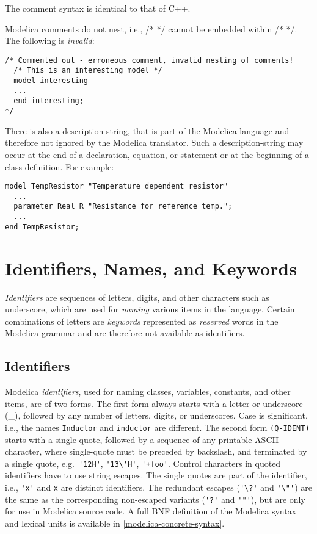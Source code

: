 \begin{nonnormative}
The comment syntax is identical to that of C++.
\end{nonnormative}

Modelica comments do not nest, i.e., /* */ cannot be embedded within /*
*/. The following is \emph{invalid}:
\begin{lstlisting}[language=modelica]
/* Commented out - erroneous comment, invalid nesting of comments!
  /* This is an interesting model */
  model interesting
  ...
  end interesting;
*/
\end{lstlisting}

There is also a description-string, that is part of the Modelica language and
therefore not ignored by the Modelica translator. Such a description-string may
occur at the end of a declaration, equation, or statement or at the
beginning of a class definition. For example:
\begin{lstlisting}[language=modelica]
model TempResistor "Temperature dependent resistor"
  ...
  parameter Real R "Resistance for reference temp.";
  ...
end TempResistor;
\end{lstlisting}

\section{Identifiers, Names, and Keywords}\label{identifiers-names-and-keywords}

\emph{Identifiers} are sequences of letters, digits, and other
characters such as underscore, which are used for \emph{naming} various
items in the language. Certain combinations of letters are
\emph{keywords} represented as \emph{reserved} words in the Modelica
grammar and are therefore not available as identifiers.

\subsection{Identifiers}\label{identifiers}

Modelica \emph{identifiers}, used for naming classes, variables,
constants, and other items, are of two forms. The first form always
starts with a letter or underscore (\_), followed by any number of
letters, digits, or underscores. Case is significant, i.e., the names
\lstinline!Inductor! and \lstinline!inductor! are different. The second form \lstinline!(Q-IDENT)! starts
with a single quote, followed by a sequence of any printable ASCII
character, where single-quote must be preceded by backslash, and
terminated by a single quote, e.g.\ \lstinline!'12H'!, \lstinline!'13\'H'!,
\lstinline!'+foo'!. Control characters in quoted identifiers have to use string
escapes.
The single quotes are part of the identifier, i.e., \lstinline!'x'! and \lstinline!x!
are distinct identifiers. The redundant escapes (\lstinline!'\?'! and \lstinline!'\"'!) are the same as the corresponding non-escaped
variants (\lstinline!'?'! and \lstinline!'"'!), but are only for use in Modelica source code.
A full BNF definition of the Modelica syntax and
lexical units is available in \cref{modelica-concrete-syntax}.

